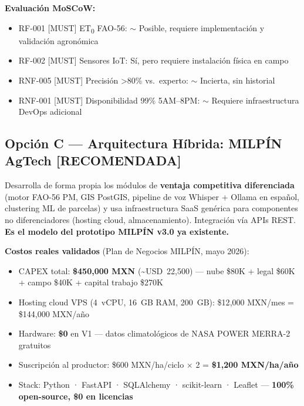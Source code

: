 \documentclass[12pt,letterpaper]{article}
\newcommand{\cmark}{{\color{verdeOk}\bfseries\ding{51}}}
\newcommand{\mmark}{{\color{orange!80!black}\bfseries$\sim$}}
\begin{document}
\textbf{Evaluación MoSCoW:}
\begin{itemize}
  \item RF-001 [MUST] ET\textsubscript{0} FAO-56: \mmark{} Posible, requiere implementación y validación agronómica
  \item RF-002 [MUST] Sensores IoT: \cmark{} Sí, pero requiere instalación física en campo
  \item RNF-005 [MUST] Precisión \textgreater{}80\% vs.\ experto: \mmark{} Incierta, sin historial
  \item RNF-001 [MUST] Disponibilidad 99\% 5AM–8PM: \mmark{} Requiere infraestructura DevOps adicional
\end{itemize}

\subsection{Opción C — Arquitectura Híbrida: MILPÍN AgTech \textnormal{[RECOMENDADA]}}

Desarrolla de forma propia los módulos de \textbf{ventaja competitiva diferenciada} (motor
FAO-56 PM, GIS PostGIS, pipeline de voz Whisper + Ollama en español, clustering ML de
parcelas) y usa infraestructura SaaS genérica para componentes no diferenciadores (hosting
cloud, almacenamiento). Integración vía APIs REST. \textbf{Es el modelo del prototipo
MILPÍN v3.0 ya existente.}

\textbf{Costos reales validados} (Plan de Negocios MILPÍN, mayo 2026):
\begin{itemize}
  \item CAPEX total: \textbf{\$450{,}000 MXN} (\textasciitilde{}USD~22{,}500) — nube \$80K + legal \$60K + campo \$40K + capital trabajo \$270K
  \item Hosting cloud VPS (4~vCPU, 16~GB RAM, 200~GB): \$12{,}000 MXN/mes = \$144{,}000 MXN/año
  \item Hardware: \textbf{\$0} en V1 — datos climatológicos de NASA POWER MERRA-2 gratuitos
  \item Suscripción al productor: \$600 MXN/ha/ciclo × 2 = \textbf{\$1{,}200 MXN/ha/año}
  \item Stack: Python · FastAPI · SQLAlchemy · scikit-learn · Leaflet — \textbf{100\% open-source, \$0 en licencias}
\end{itemize}
\end{document}
